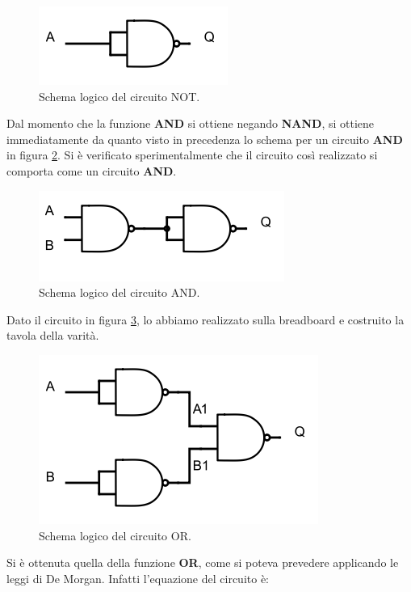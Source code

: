 \documentclass[journal, a4paper]{IEEEtran}
\begin{document}
\begin{figure}[htp]
\centering
\includegraphics[scale=.6]{not}
\caption{Schema logico del circuito NOT.}
\label{fig:not}
\end{figure}

Dal momento che la funzione \textbf{AND} si ottiene negando \textbf{NAND}, si ottiene immediatamente da quanto visto in precedenza lo schema per un circuito \textbf{AND} in figura \ref{fig:and}. Si è verificato sperimentalmente che il circuito così realizzato si comporta come un circuito \textbf{AND}.

\begin{figure}[htp]
\centering
\includegraphics[scale=.6]{and}
\caption{Schema logico del circuito AND.}
\label{fig:and}
\end{figure}

Dato il circuito in figura \ref{fig:or}, lo abbiamo realizzato sulla breadboard e costruito la tavola della varità. 

\begin{figure}[htp]
\centering
\includegraphics[scale=.6]{or}
\caption{Schema logico del circuito OR.}
\label{fig:or}
\end{figure}

Si è ottenuta quella della funzione \textbf{OR}, come si poteva prevedere applicando le leggi di De Morgan. Infatti l'equazione del circuito è:
\end{document}
